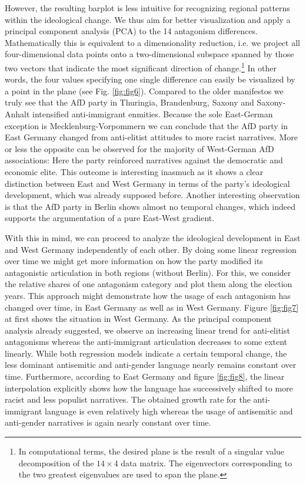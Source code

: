 \documentclass[a4paper]{scrreprt}
\begin{document}
However, the resulting barplot is less intuitive for recognizing regional patterns within the ideological change. We thus aim for better visualization and apply a principal component analysis (PCA) to the 14 antagonism differences. Mathematically this is equivalent to a dimensionality reduction, i.e. we project all four-dimensional data points onto a two-dimensional subspace spanned by those two vectors that indicate the most significant direction of change.\footnote{In computational terms, the desired plane is the result of a singular value decomposition of the $14\times 4$ data matrix. The eigenvectors corresponding to the two greatest eigenvalues are used to span the plane.} In other words, the four values specifying one single difference can easily be visualized by a point in the plane (see Fig. \ref{fig:fig6}). Compared to the older manifestos we truly see that the AfD party in Thuringia, Brandenburg, Saxony and Saxony-Anhalt intensified anti-immigrant enmities. Because the sole East-German exception is Mecklenburg-Vorpommern we can conclude that the AfD party in East Germany changed from anti-elitist attitudes to more racist narratives. More or less the opposite can be observed for the majority of West-German AfD associations: Here the party reinforced narratives against the democratic and economic elite. This outcome is interesting inasmuch as it shows a clear distinction between East and West Germany in terms of the party's ideological development, which was already supposed before. Another interesting observation is that the AfD party in Berlin shows almost no temporal changes, which indeed supports the argumentation of a pure East-West gradient.\par
With this in mind, we can proceed to analyze the ideological development in East and West Germany independently of each other. By doing some linear regression over time we might get more information on how the party modified its antagonistic articulation in both regions (without Berlin). For this, we consider the relative shares of one antagonism category and plot them along the election years. This approach might demonstrate how the usage of each antagonism has changed over time, in East Germany as well as in West Germany. Figure \ref{fig:fig7} at first shows the situation in West Germany. As the principal component analysis already suggested, we observe an increasing linear trend for anti-elitist antagonisms whereas the anti-immigrant articulation decreases to some extent linearly. While both regression models indicate a certain temporal change, the less dominant antisemitic and anti-gender language nearly remains constant over time. Furthermore, according to East Germany and figure \ref{fig:fig8}, the linear interpolation explicitly shows how the language has successively shifted to more racist and less populist narratives. The obtained growth rate for the anti-immigrant language is even relatively high whereas the usage of antisemitic and anti-gender narratives is again nearly constant over time.\par
\end{document}
